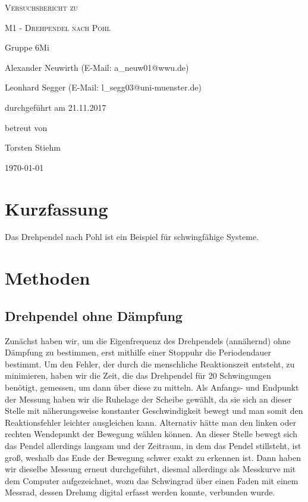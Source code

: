 \documentclass[
	a4paper,
	12pt,
	pagesize,
	ngerman
]{scrartcl}
\begin{document}
	
	\begin{titlepage}
		\centering
		{\scshape\LARGE Versuchsbericht zu \par}
		\vspace{1cm}
		{\scshape\huge M1 - Drehpendel nach Pohl\par}
		\vspace{2.5cm}
		{\LARGE Gruppe 6Mi \par}
		\vspace{0.5cm}
		
		{\large Alexander Neuwirth (E-Mail: a\_neuw01@wwu.de) \par}
		{\large Leonhard Segger (E-Mail: l\_segg03@uni-muenster.de) \par}
		\vfill
		
		durchgeführt am 21.11.2017\par
		betreut von\par
		{\large Torsten Stiehm}
		
		\vfill
		
		{\large \today\par}
	\end{titlepage}
	\tableofcontents
	\newpage
	
	\section{Kurzfassung}
	Das Drehpendel nach Pohl ist ein Beispiel für schwingfähige Systeme.
	\section{Methoden}
	
	\subsection{Drehpendel ohne Dämpfung}%
	Zunächst haben wir, um die Eigenfrequenz des Drehpendels (annähernd) ohne Dämpfung zu bestimmen, erst mithilfe einer Stoppuhr die Periodendauer bestimmt. Um den Fehler, der durch die menschliche Reaktionszeit entsteht, zu minimieren, haben wir die Zeit, die das Drehpendel für 20 Schwingungen benötigt, gemessen, um dann über diese zu mitteln.
	Als Anfangs- und Endpunkt der Messung haben wir die Ruhelage der Scheibe gewählt, da sie sich an dieser Stelle mit näherungsweise konstanter Geschwindigkeit bewegt und man somit den Reaktionsfehler leichter ausgleichen kann.
	Alternativ hätte man den linken oder rechten Wendepunkt der Bewegung wählen können. An dieser Stelle bewegt sich das Pendel allerdings langsam und der Zeitraum, in dem das Pendel stillsteht, ist groß, weshalb das Ende der Bewegung schwer exakt zu erkennen ist. %
	Dann haben wir dieselbe Messung erneut durchgeführt, diesmal allerdings als Messkurve mit dem Computer aufgezeichnet, wozu das Schwingrad über einen Faden mit einem Messrad, dessen Drehung digital erfasst werden konnte, verbunden wurde. %
\end{document}
